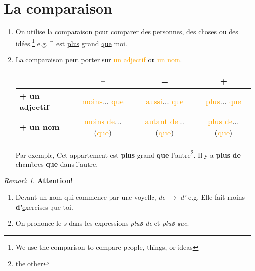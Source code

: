 \documentclass[math,code]{amznotes}
\theoremstyle{remark}
\newtheorem*{remark}{Remark}
\begin{document}
\section{La comparaison}
\begin{enumerate}
    \item On utilise la comparaison pour comparer des personnes, des choses ou des idées.\footnote{We use the comparison to compare people, things, or ideas} \newline
    e.g. Il est \underline{plus} grand \underline{que} moi.
    \item La comparaison peut porter sur \textcolor{orange}{un adjectif} ou \textcolor{orange}{un nom}.
    \begin{table}[H]
        \centering
        \renewcommand{\arraystretch}{1.5}
        \begin{tabular}{|l|c|c|c|}
            \hline
             & \textbf{–} & \textbf{=} & \textbf{+} \\
            \hline
            \textbf{+ un adjectif} & \textcolor{orange}{moins}... \textcolor{orange}{que} & \textcolor{orange}{aussi}... \textcolor{orange}{que} & \textcolor{orange}{plus}... \textcolor{orange}{que} \\
            \hline
            \textbf{+ un nom} & \textcolor{orange}{moins de}... (\textcolor{orange}{que}) & \textcolor{orange}{autant de}... (\textcolor{orange}{que}) & \textcolor{orange}{plus de}... (\textcolor{orange}{que}) \\
            \hline
        \end{tabular}
    \end{table}
    Par exemple, \newline
    Cet appartement est \textbf{plus} grand \textbf{que} l'autre\footnote{the other}. \newline
    Il y a \textbf{plus de} chambres \textbf{que} dans l'autre.
\end{enumerate}
\begin{notebox}
    \begin{remark} \textbf{Attention}!
    \begin{enumerate}
        \item Devant un nom qui commence par une voyelle, \textit{de} $\rightarrow$ \textit{d'} \newline
        e.g. Elle fait moins \textbf{d'}\underline{e}xercises que toi.
        \item On prononce le \textit{s} dans les expressions \textit{plu\textbf{s} de} et \textit{plu\textbf{s} que}.
    \end{enumerate}
    \end{remark}
\end{notebox}
\end{document}
